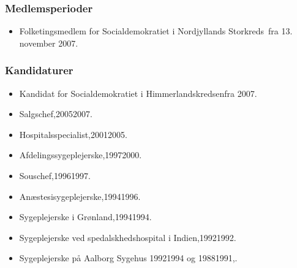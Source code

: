 \documentclass[11pt, a4paper]{awesome-cv}
\begin{document}
\begin{cvletter}
\subsubsection*{Medlemsperioder}
\begin{itemize}
\item Folketingsmedlem for Socialdemokratiet i Nordjyllands Storkreds fra 13. november 2007.
\end{itemize}
\subsubsection*{Kandidaturer}
\begin{itemize}
\item Kandidat for Socialdemokratiet i Himmerlandskredsenfra 2007.
\end{itemize}
\begin{itemize}
\item Salgschef,20052007.
\item Hospitalsspecialist,20012005.
\item Afdelingssygeplejerske,19972000.
\item Souschef,19961997.
\item Anæstesisygeplejerske,19941996.
\item Sygeplejerske i Grønland,19941994.
\item Sygeplejerske ved spedalskhedshospital i Indien,19921992.
\item Sygeplejerske på Aalborg Sygehus 19921994 og 19881991,.
\end{itemize}
\end{cvletter}
\end{document}
